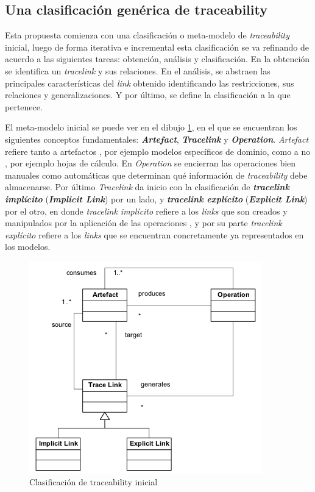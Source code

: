 \documentclass[a4paper,12pt,oneside,spanish]{book}
\begin{document}
\subsection{Una clasificación genérica de traceability}
\label{sec:ClasificacionTraceability}


Esta propuesta comienza con una clasificación o meta-modelo de \textit{traceability} inicial, luego de forma iterativa e incremental esta clasificación se va refinando de acuerdo a las siguientes tareas: obtención, análisis y clasificación. En la obtención se identifica un \textit{tracelink} y sus relaciones. En el análisis, se abstraen las principales características del \textit{link} obtenido identificando las restricciones, sus relaciones y generalizaciones. Y por último, se define la clasificación a la que pertenece.

El meta-modelo inicial se puede ver en el dibujo \ref{fig:ClasifInicial}, en el que se encuentran los siguientes conceptos fundamentales: \textit{\textbf{Artefact}}, \textit{\textbf{Tracelink}} y \textit{\textbf{Operation}}. \textit{Artefact} refiere tanto a artefactos , por ejemplo modelos específicos de dominio, como a no , por ejemplo hojas de cálculo. En \textit{Operation} se encierran las operaciones bien manuales como automáticas que determinan qué información de \textit{traceability} debe almacenarse. Por último \textit{Tracelink} da inicio con la clasificación de \textit{\textbf{tracelink implícito}} (\textit{\textbf{Implicit Link}}) por un lado, y \textit{\textbf{tracelink explícito}} (\textit{\textbf{Explicit Link}}) por el otro, en donde \textit{tracelink implícito} refiere a los \textit{links} que son creados y manipulados por la aplicación de las operaciones , y por su parte \textit{tracelink explícito} refiere a los \textit{links} que se encuentran concretamente ya representados en los modelos.


\begin{figure}[hbtp]
\centering
\includegraphics[scale=0.75]{./img/ExplicitImplicitTraceLinkClassification}
\caption{Clasificación de traceability inicial}
\label{fig:ClasifInicial}
\end{figure}
\end{document}
